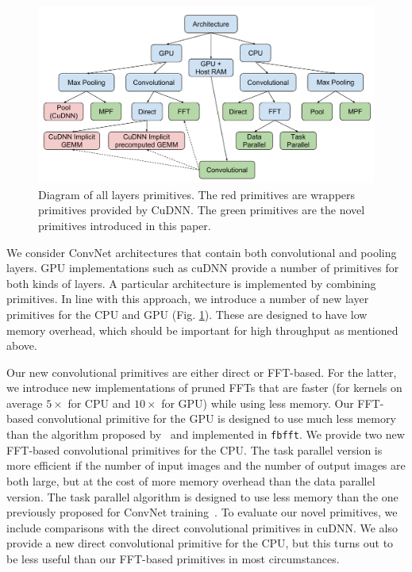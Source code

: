 \documentclass[conference]{./IEEEtran/IEEEtran}
\begin{document}
  \begin{figure}
    \begin{center}
      \includegraphics[width=0.79\columnwidth]{fig/alllayersram.pdf}
    \end{center}
    \caption{Diagram of all layers primitives.  The red primitives are
      wrappers primitives provided by CuDNN.  The green primitives are
      the novel primitives introduced in this paper.}
    \label{fig:layers}
  \end{figure}

  We consider ConvNet architectures that contain both convolutional
  and pooling layers.  GPU implementations such as cuDNN provide a
  number of primitives for both kinds of layers.  A particular
  architecture is implemented by combining primitives.  In line with
  this approach, we introduce a number of new layer primitives for the
  CPU and GPU (Fig. \ref{fig:layers}).  These are designed to have low
  memory overhead, which should be important for high throughput as
  mentioned above.

  Our new convolutional primitives are either direct or FFT-based.
  For the latter, we introduce new implementations of pruned FFTs that
  are faster (for kernels on average $5\times$ for CPU and $10\times$
  for GPU) while using less memory.  Our FFT-based convolutional
  primitive for the GPU is designed to use much less memory than the
  algorithm proposed by~\cite{mathieu-iclr-14,vasilache2014fast} and
  implemented in {\tt fbfft}.  We provide two new FFT-based
  convolutional primitives for the CPU. The task parallel version is
  more efficient if the number of input images and the number of
  output images are both large, but at the cost of more memory
  overhead than the data parallel version.  The task parallel
  algorithm is designed to use less memory than the one previously
  proposed for ConvNet training~\cite{zlateski2015znn}.  To evaluate
  our novel primitives, we include comparisons with the direct
  convolutional primitives in cuDNN.  We also provide a new direct
  convolutional primitive for the CPU, but this turns out to be less
  useful than our FFT-based primitives in most circumstances.
\end{document}
